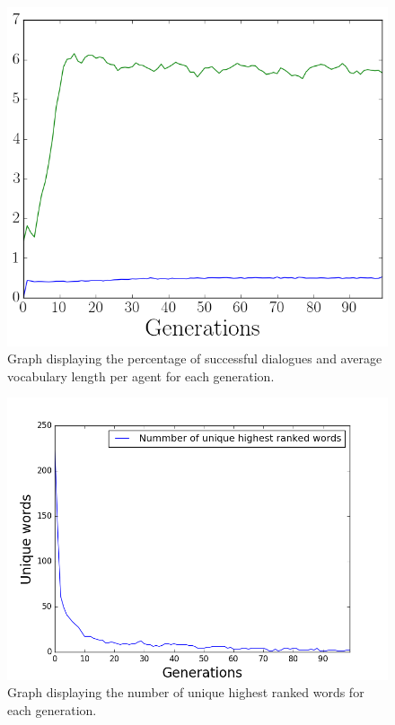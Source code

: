 \begin{figure}[htbp]
    \centering
    \includegraphics[scale=0.5]{fig/Results/Exp7/Vocabulary1}
    \caption{Graph displaying the percentage of successful dialogues and average vocabulary length per agent for each generation.}
    \label{fig:Vocabulary7}
\end{figure}
\begin{figure}[htbp]
    \centering
    \includegraphics[scale=0.5]{fig/Results/Exp7/UniqueWords2}
    \caption{Graph displaying the number of unique highest ranked words for each generation.}
    \label{fig:UniqueWords7.1}
\end{figure}
